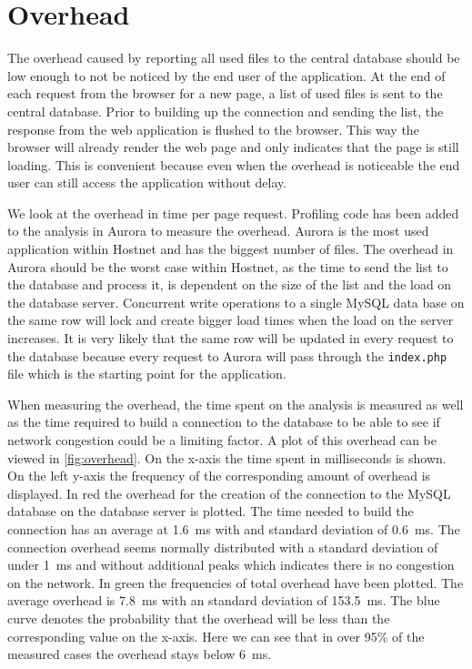\section{Overhead}
\label{sec:overhead}

The overhead caused by reporting all used files to the central database should be low enough to not be noticed by the end user of the application. At the end of each request from the browser for a new page, a list of used files is sent to the central database. Prior to building up the connection and sending the list, the response from the web application is flushed to the browser. This way the browser will already render the web page and only indicates that the page is still loading. This is convenient because even when the overhead is noticeable the end user can still access the application without delay.

We look at the overhead in time per page request. Profiling code has been added to the analysis in Aurora to measure the overhead. Aurora is the most used application within Hostnet and has the biggest number of files. The overhead in Aurora should be the worst case within Hostnet, as the time to send the list to the database and process it, is dependent on the size of the list and the load on the database server. Concurrent write operations to a single MySQL data base on the same row will lock and create bigger load times when the load on the server increases. It is very likely that the same row will be updated in every request to the database because every request to Aurora will pass through the \verb|index.php| file which is the starting point for the application.

When measuring the overhead, the time spent on the analysis is measured as well as the time required to build a connection to the database to be able to see if network congestion could be a limiting factor. A plot of this overhead can be viewed in \autoref{fig:overhead}. On the x-axis the time spent in milliseconds is shown. On the left y-axis the frequency of the corresponding amount of overhead is displayed. In red the overhead for the creation of the connection to the MySQL database on the database server is plotted. The time needed to build the connection has an average at 1.6~ms with and standard deviation of 0.6~ms. The connection overhead seems normally distributed with a standard deviation of under 1~ms and without additional peaks which indicates there is no congestion on the network. In green the frequencies of total overhead have been plotted. The average overhead is 7.8~ms with an standard deviation of 153.5~ms. The blue curve denotes the probability that the overhead will be less than the corresponding value on the x-axis. Here we can see that in over 95\% of the measured cases the overhead stays below 6~ms.

